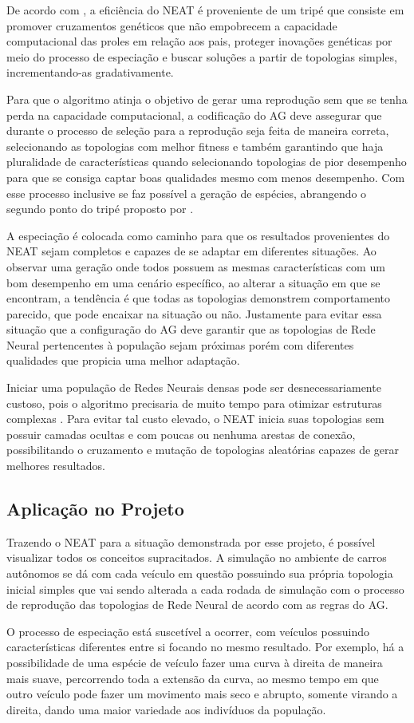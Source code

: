 De acordo com  , a eficiência do NEAT é proveniente de um 
tripé que consiste em promover cruzamentos genéticos que não empobrecem a 
capacidade computacional das proles em relação aos pais, proteger inovações 
genéticas por meio do processo de especiação e buscar soluções a partir de 
topologias simples, incrementando-as gradativamente. 

Para que o algoritmo atinja o objetivo de gerar uma reprodução sem que se 
tenha perda na capacidade computacional, a codificação do AG deve assegurar que 
durante o processo de seleção para a reprodução seja feita de maneira correta, 
selecionando as topologias com melhor fitness e também garantindo que haja 
pluralidade de características quando selecionando topologias de pior desempenho 
para que se consiga captar boas qualidades mesmo com menos desempenho. Com 
esse processo inclusive se faz possível a geração de espécies, abrangendo o 
segundo ponto do tripé proposto por .

A especiação é colocada como caminho para que os resultados provenientes 
do NEAT sejam completos e capazes de se adaptar em diferentes situações. Ao 
observar uma geração onde todos possuem as mesmas características com um 
bom desempenho em uma cenário específico, ao alterar a situação em que se 
encontram, a tendência é que todas as topologias demonstrem comportamento 
parecido, que pode encaixar na situação ou não. Justamente para evitar essa 
situação que a configuração do AG deve garantir que as topologias de Rede Neural 
pertencentes à população sejam próximas porém com diferentes qualidades que 
propicia uma melhor adaptação.

Iniciar uma população de Redes Neurais densas pode ser 
desnecessariamente custoso, pois o algoritmo precisaria de muito tempo para 
otimizar estruturas complexas \cite{stanley2002}. Para evitar tal 
custo elevado, o NEAT inicia suas topologias sem possuir camadas ocultas e com 
poucas ou nenhuma arestas de conexão, possibilitando o cruzamento e mutação de 
topologias aleatórias capazes de gerar melhores resultados.

\subsection{Aplica{\c c}{\~a}o no Projeto}

Trazendo o NEAT para a situação demonstrada por esse projeto, é possível 
visualizar todos os conceitos supracitados. A simulação no ambiente de carros 
autônomos se dá com cada veículo em questão possuindo sua própria topologia 
inicial simples que vai sendo alterada a cada rodada de simulação com o processo 
de reprodução das topologias de Rede Neural de acordo com as regras do AG. 

O processo de especiação está suscetível a ocorrer, com veículos possuindo 
características diferentes entre si focando no mesmo resultado. Por exemplo, há a 
possibilidade de uma espécie de veículo fazer uma curva à direita de maneira mais 
suave, percorrendo toda a extensão da curva, ao mesmo tempo em que outro 
veículo pode fazer um movimento mais seco e abrupto, somente virando a direita, 
dando uma maior variedade aos indivíduos da população.
